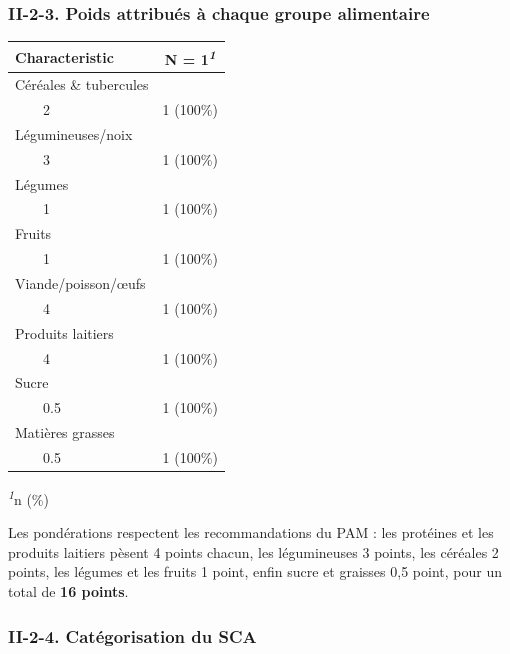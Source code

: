 \documentclass[
]{article}
\begin{document}
\hypertarget{ii-2-3.-poids-attribuuxe9s-uxe0-chaque-groupe-alimentaire}{%
\subsubsection{II-2-3. Poids attribués à chaque groupe
alimentaire}\label{ii-2-3.-poids-attribuuxe9s-uxe0-chaque-groupe-alimentaire}}

\begin{table}[!t]
\fontsize{9.8pt}{11.7pt}\selectfont
\begin{tabular*}{\linewidth}{@{\extracolsep{\fill}}lc}
\toprule
\textbf{Characteristic} & \textbf{N = 1}\textsuperscript{\textit{1}} \\ 
\midrule\addlinespace[2.5pt]
Céréales \& tubercules &  \\ 
    2 & 1 (100\%) \\ 
Légumineuses/noix &  \\ 
    3 & 1 (100\%) \\ 
Légumes &  \\ 
    1 & 1 (100\%) \\ 
Fruits &  \\ 
    1 & 1 (100\%) \\ 
Viande/poisson/œufs &  \\ 
    4 & 1 (100\%) \\ 
Produits laitiers &  \\ 
    4 & 1 (100\%) \\ 
Sucre &  \\ 
    0.5 & 1 (100\%) \\ 
Matières grasses &  \\ 
    0.5 & 1 (100\%) \\ 
\bottomrule
\end{tabular*}
\begin{minipage}{\linewidth}
\textsuperscript{\textit{1}}n (\%)\\
\end{minipage}
\end{table}

Les pondérations respectent les recommandations du PAM : les protéines
et les produits laitiers pèsent 4 points chacun, les légumineuses 3
points, les céréales 2 points, les légumes et les fruits 1 point, enfin
sucre et graisses 0,5 point, pour un total de \textbf{16 points}.

\hypertarget{ii-2-4.-catuxe9gorisation-du-sca}{%
\subsubsection{II-2-4. Catégorisation du
SCA}\label{ii-2-4.-catuxe9gorisation-du-sca}}
\end{document}
